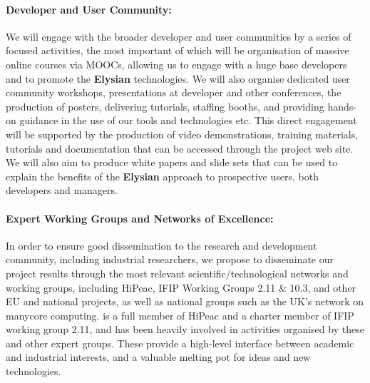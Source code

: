 \documentclass[a4paper,11pt]{article}
\newcommand{\project}[1]{\textbf{#1}\xspace}
\newcommand{\SECURITY}{\project{Elysian}}
\newcommand{\TheProject}{\SECURITY}
\begin{document}
\paragraph{Developer and User Community:} We will engage with the broader
developer and user communities by a series of focused activities, the most important of which will be organisation of massive online courses via MOOCs, allowing us to engage with a huge base developers and to promote the \TheProject{} technologies.
 We will also organise dedicated user community workshops, presentations at
 developer and other conferences, 
 the production of posters, delivering tutorials, staffing booths, and providing hands-on
 guidance in the use of our tools and technologies etc.  This direct engagement will be
 supported by the production of video demonstrations, training materials, tutorials and documentation that can
 be accessed through the project web site.  We will also aim to produce white papers and slide sets that
 can be used to explain the benefits of the \TheProject{} approach to prospective users, both developers
 and managers.

 \paragraph{Expert Working Groups and Networks of Excellence:}
In order to ensure good dissemination to the research and development
community, including industrial researchers, we propose to disseminate
our project results through the most relevant scientific/technological
networks and working groups, including HiPeac,%
IFIP Working Groups 2.11 \& 10.3, and other EU and national projects,
as well as national groups such as the UK's network on manycore computing.
\SAshort{} is a full member of HiPeac and a charter member of IFIP working
group 2.11, and has been heavily involved in activities organised by these and other expert groups.
These provide a high-level interface between academic and industrial interests, and a valuable
melting pot for ideas and new technologies. 
\end{document}

